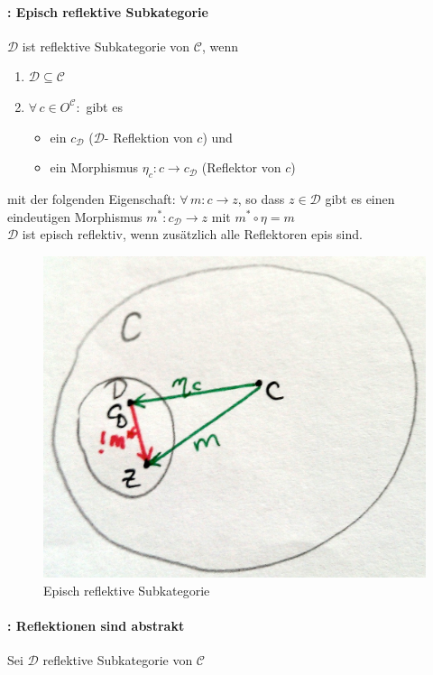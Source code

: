 \paragraph{: Episch reflektive Subkategorie}
$\mathcal{D}$ ist reflektive Subkategorie von $\mathcal{C}$, wenn
\begin{enumerate}
\item $\mathcal{D} \subseteq \mathcal{C}$
\item $\forall \, c \in O^\mathcal{C}: $  gibt es 
\begin{itemize}
\item ein $c_\mathcal{D} $ ($\mathcal{D}$- Reflektion von $c$) und 
\item ein Morphismus $\eta_c: c \rightarrow c_\mathcal{D} $ (Reflektor von $c$) 
\end{itemize}
\end{enumerate}

mit der folgenden Eigenschaft: $\forall \,  m: c \rightarrow z$, so dass $z \in \mathcal{D}$ gibt es einen eindeutigen Morphismus $m^* : c_\mathcal{D} \rightarrow z$ mit $m^* \circ \eta = m$ \\
$\mathcal{D} $ ist episch reflektiv, wenn zusätzlich alle Reflektoren epis sind. 

\begin{figure}[h]
\noindent \centering{}\includegraphics[scale=0.1]{Abbildungen/153}\caption{Episch reflektive Subkategorie}
\end{figure}

\paragraph{: Reflektionen sind abstrakt}
Sei $\mathcal{D} $ reflektive Subkategorie von $\mathcal{C} $

